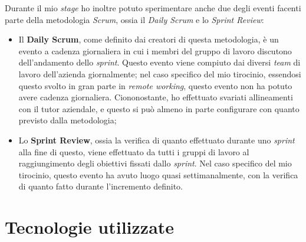 Durante il mio \textit{stage} ho inoltre potuto sperimentare anche due degli eventi facenti parte della metodologia \textit{Scrum}, ossia il \textit{Daily Scrum} e lo \textit{Sprint Review}:
\begin{itemize}
  \item Il \textbf{Daily Scrum}, come definito dai creatori di questa metodologia, è un evento a cadenza giornaliera in cui i membri del gruppo di lavoro discutono dell'andamento dello \textit{sprint}. Questo evento viene compiuto dai diversi \textit{team} di lavoro dell'azienda giornalmente; nel caso specifico del mio tirocinio, essendosi questo svolto in gran parte in \textit{remote working}, questo evento non ha potuto avere cadenza giornaliera. Ciononostante, ho effettuato svariati allineamenti con il tutor aziendale, e questo si può almeno in parte configurare con quanto previsto dalla metodologia;
  \item Lo \textbf{Sprint Review}, ossia la verifica di quanto effettuato durante uno \textit{sprint} alla fine di questo, viene effettuato da tutti i gruppi di lavoro al raggiungimento degli obiettivi fissati dallo \textit{sprint}. Nel caso specifico del mio tirocinio, questo evento ha avuto luogo quasi settimanalmente, con la verifica di quanto fatto durante l'incremento definito.
\end{itemize}


\section{Tecnologie utilizzate}

